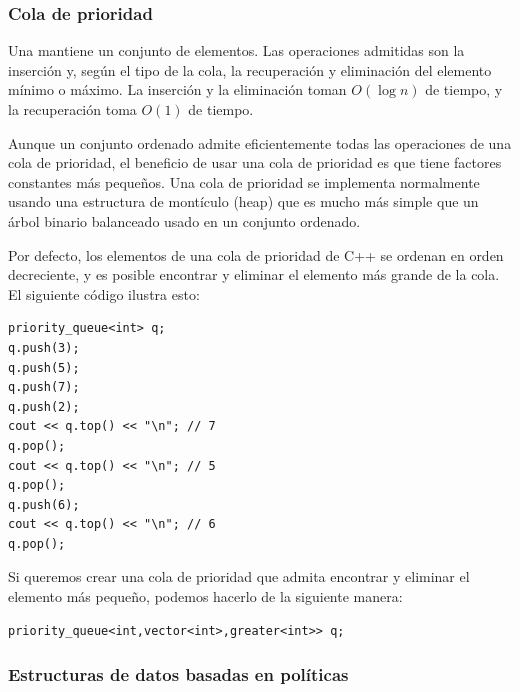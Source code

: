 \subsubsection{Cola de prioridad}


Una 
mantiene un conjunto de elementos.
Las operaciones admitidas son la inserción y,
según el tipo de la cola,
la recuperación y eliminación del
elemento mínimo o máximo.
La inserción y la eliminación toman $O(\log n)$ de tiempo,
y la recuperación toma $O(1)$ de tiempo.

Aunque un conjunto ordenado admite eficientemente
todas las operaciones de una cola de prioridad,
el beneficio de usar una cola de prioridad es
que tiene factores constantes más pequeños.
Una cola de prioridad se implementa normalmente usando
una estructura de montículo (heap) que es mucho más simple que un
árbol binario balanceado usado en un conjunto ordenado.

\begin{samepage}
Por defecto, los elementos de una cola de
prioridad de C++ se ordenan en orden decreciente,
y es posible encontrar y eliminar el
elemento más grande de la cola.
El siguiente código ilustra esto:

\begin{lstlisting}
priority_queue<int> q;
q.push(3);
q.push(5);
q.push(7);
q.push(2);
cout << q.top() << "\n"; // 7
q.pop();
cout << q.top() << "\n"; // 5
q.pop();
q.push(6);
cout << q.top() << "\n"; // 6
q.pop();
\end{lstlisting}
\end{samepage}

Si queremos crear una cola de prioridad
que admita encontrar y eliminar
el elemento más pequeño,
podemos hacerlo de la siguiente manera:

\begin{lstlisting}
priority_queue<int,vector<int>,greater<int>> q;
\end{lstlisting}

\subsubsection{Estructuras de datos basadas en políticas}

